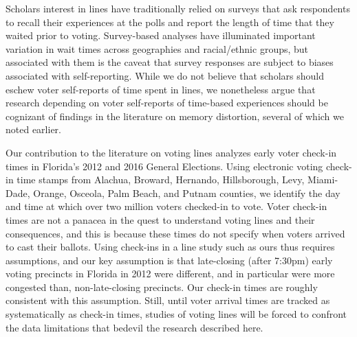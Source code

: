 \documentclass[12pt,titlepage]{article}
\begin{document}

Scholars interest in lines have traditionally relied on surveys that
ask respondents to recall their experiences at the polls and report
the length of time that they waited prior to voting. Survey-based
analyses have illuminated important variation in wait times across
geographies and racial/ethnic groups, but associated with them is the
caveat that survey responses are subject to biases associated with
self-reporting. While we do not believe that scholars should eschew
voter self-reports of time spent in lines, we nonetheless argue that
research depending on voter self-reports of time-based experiences
should be cognizant of findings in the literature on memory
distortion, several of which we noted earlier.




Our contribution to the literature on voting lines analyzes early
voter check-in times in Florida's 2012 and 2016 General Elections.
Using electronic voting check-in time stamps from Alachua, Broward,
Hernando, Hillsborough, Levy, Miami-Dade, Orange, Osceola, Palm Beach,
and Putnam counties, we identify the day and time at which over two
million voters checked-in to vote.  Voter check-in times are not a
panacea in the quest to understand voting lines and their
consequences, and this is because these times do not specify when
voters arrived to cast their ballots. Using check-ins in a line study
such as ours thus requires assumptions, and our key assumption is that
late-closing (after 7:30pm) early voting precincts in Florida in 2012
were different, and in particular were more congested than,
non-late-closing precincts. Our check-in times are roughly consistent
with this assumption. Still, until voter arrival times are tracked as
systematically as check-in times, studies of voting lines will be
forced to confront the data limitations that bedevil the research
described here.
\end{document}
